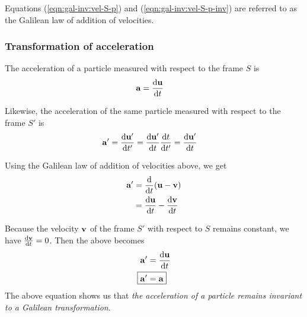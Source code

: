 			Equations (\ref{eqn:gal-inv:vel-S-p}) and (\ref{eqn:gal-inv:vel-S-p-inv}) are referred to as the Galilean law of addition of velocities.
		
		\subsubsection{Transformation of acceleration}
			The acceleration of a particle measured with respect to the frame $S$ is
			\begin{align*}
				\vb{a}&=\dv{\vb{u}}{t}
			\end{align*}
			
			Likewise, the acceleration of the same particle measured with respect to the frame $S'$ is
			\begin{align*}
				\vb{a}'&=\dv{\vb{u}'}{t'}=\dv{\vb{u}'}{t}\dv{t}{t'}=\dv{\vb{u}'}{t}
			\end{align*}
			
			Using the Galilean law of addition of velocities above, we get
			\begin{align*}
				\vb{a}'&=\dv{t}\qty(\vb{u}-\vb{v}) \\
					&=\dv{\vb{u}}{t}-\dv{\vb{v}}{t}
			\end{align*}
			
			Because the velocity $\vb{v}$ of the frame $S'$ with respect to $S$ remains constant, we have $\dv{\vb{v}}{t}=0$. Then the above becomes
			\begin{align*}
				\vb{a}'&=\dv{\vb{u}}{t} \\
				\Aboxed{\vb{a}'&=\vb{a}}
			\end{align*}
				The above equation shows us that \emph{the acceleration of a particle remains invariant to a Galilean transformation}.